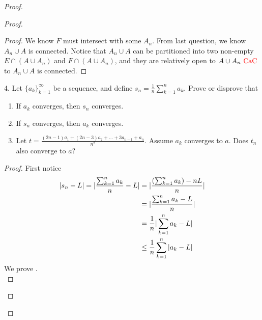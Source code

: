 \documentclass{report}
\begin{document}
\begin{proof}
\begin{proof}
\begin{proof}
We know $F$ must intersect with some  $A_n$. From last question, we know $A_n\cup A$ is connected. Notice that $A_n\cup A$ can be partitioned into two non-empty $E\cap (A\cup A_n)$ and $F\cap (A\cup A_n)$, and they are relatively open to $A\cup A_n\text{ \textcolor{red}{CaC} }$ to $A_n\cup A$ is connected.
\end{proof}
\begin{question}{}{}
4. Let $\{a_k\}_{k=1}^{\infty}$ be a sequence, and define $s_n = \frac{1}{n} \sum_{k=1}^{n} a_k$. Prove or disprove that
\begin{enumerate}[label=(\alph*)]
  \item If ${a_k}$ converges, then $s_n$ converges.\\
  \item If $s_n$ converges, then $a_k$ converges.\\
  \item Let $t = \frac{(2n-1)a_1 + (2n-3)a_2 + \ldots + 3a_{n-1} + a_n}{n^2}$. Assume ${a_k}$ converges to $a$. Does $t_n$ also converge to $a$?
\end{enumerate}
\end{question}
\begin{proof}
First notice
\begin{align}
  |s_n-L|=|\frac{\sum_{k=1}^n a_k}{n}-L|&=|\frac{(\sum_{k=1}^na_k)-nL}{n}|\\
  &=|\frac{\sum _{k=1}^n a_k-L}{n}|\\
  &=\frac{1}{n}|\sum_{k=1}^n a_k-L|\\
  &\leq \frac{1}{n} \sum_{k=1}^n |a_k-L|
\end{align}
We prove .\\


\end{proof}
\end{proof}
\end{proof}
\end{document}
